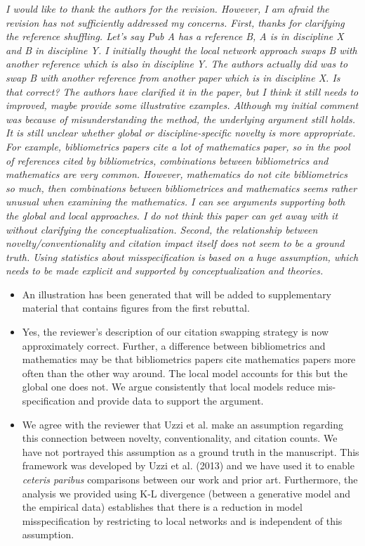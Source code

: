\documentclass[11pt, oneside]{article}   	%
\begin{document}
\begin{itemize}
\begin{enumerate}
\emph{I would like to thank the authors for the revision.  However, I am afraid the revision has not sufficiently addressed my concerns. First, thanks for clarifying the reference shuffling.  Let’s say Pub A has a reference B, A is in discipline X and B in discipline Y.  I initially thought the local network approach swaps B with another reference which is also in discipline Y.  The authors actually did was to swap B with another reference from another paper which is in discipline X.  Is that correct?  The authors have clarified it in the paper, but I think it still needs to improved, maybe provide some illustrative examples.  Although my initial comment was because of misunderstanding the method, the underlying argument still holds.  It is still unclear whether global or discipline-specific novelty is more appropriate.  For example, bibliometrics papers cite a lot of mathematics paper, so in the pool of references cited by bibliometrics, combinations between bibliometrics and mathematics are very common. However, mathematics do not cite bibliometrics so much, then combinations between bibliometrices and mathematics seems rather unusual when examining the mathematics. I can see arguments supporting both the global and local approaches. I do not think this paper can get away with it without clarifying the conceptualization. Second, the relationship between novelty/conventionality and citation impact itself does not seem to be a ground truth. Using statistics about misspecification is based on a huge assumption, which needs to be made explicit and supported by conceptualization and theories.}

\begin{itemize}
\item An illustration has been generated that will be added to supplementary material that contains figures from the first rebuttal.
\item Yes, the reviewer's description of our citation swapping strategy is now approximately correct. Further, a difference between bibliometrics and mathematics may be that bibliometrics papers cite mathematics papers more often than the other way around. The local model accounts for this but the global one does not. We argue consistently that local models reduce mis-specification and provide data to support the argument.
\item We agree with the reviewer that Uzzi et al. make an assumption regarding this connection between novelty, conventionality, and citation counts. We have not portrayed this assumption as a ground truth in the manuscript. This framework was developed by Uzzi et al. (2013) and we have used it to enable \emph{ceteris paribus} comparisons between our work and prior art. Furthermore, the analysis we provided using K-L divergence (between a generative model and the empirical data) establishes that there is a reduction in model misspecification by restricting to local networks and is independent of this assumption.
\end{itemize}


\end{enumerate}
\end{itemize}
\end{document}
